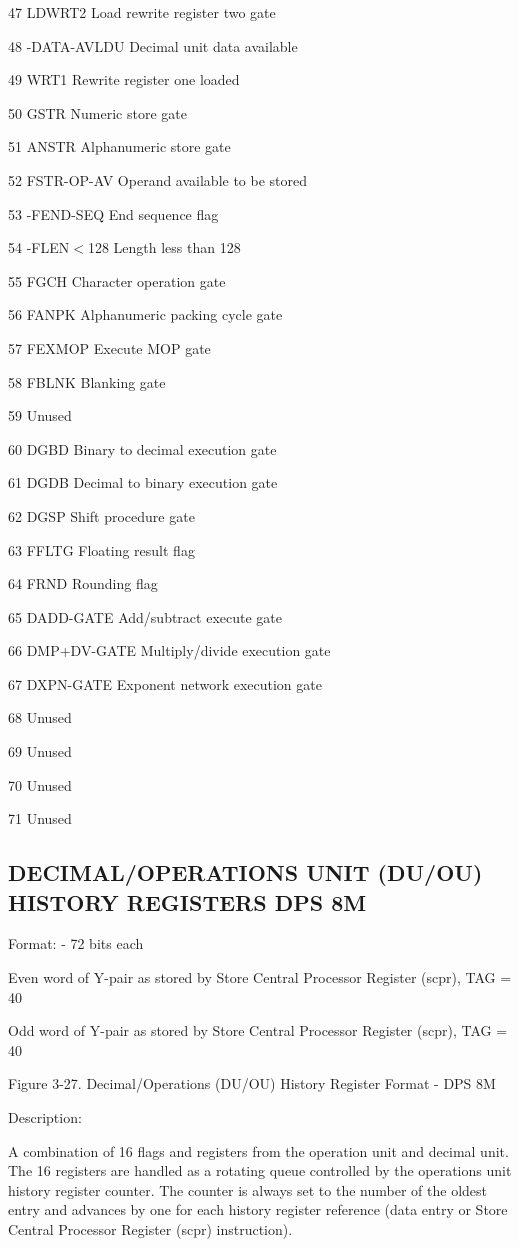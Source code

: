 47 LDWRT2 Load rewrite register two gate

48 -DATA-AVLDU Decimal unit data available

49 WRT1 Rewrite register one loaded

50 GSTR Numeric store gate

51 ANSTR Alphanumeric store gate

52 FSTR-OP-AV Operand available to be stored

53 -FEND-SEQ End sequence flag

54 -FLEN$<$128 Length less than 128

55 FGCH Character operation gate

56 FANPK Alphanumeric packing cycle gate

57 FEXMOP Execute MOP gate

58 FBLNK Blanking gate

59 Unused

60 DGBD Binary to decimal execution gate

61 DGDB Decimal to binary execution gate

62 DGSP Shift procedure gate

63 FFLTG Floating result flag

64 FRND Rounding flag

65 DADD-GATE Add/subtract execute gate

66 DMP+DV-GATE Multiply/divide execution gate

67 DXPN-GATE Exponent network execution gate

68 Unused

69 Unused

70 Unused

71 Unused

\subsection{DECIMAL/OPERATIONS UNIT (DU/OU) HISTORY REGISTERS DPS 8M}

Format: - 72 bits each

Even word of Y-pair as stored by Store Central Processor Register (scpr), TAG = 40

Odd word of Y-pair as stored by Store Central Processor Register (scpr), TAG = 40

Figure 3-27. Decimal/Operations (DU/OU) History Register Format - DPS 8M

Description:

A combination of 16 flags and registers from the operation unit and decimal unit. The 16 registers are handled as a rotating queue controlled by the operations unit history register counter. The counter is always set to the number of the oldest entry and advances by one for each history register reference (data entry or Store Central Processor Register (scpr) instruction).

